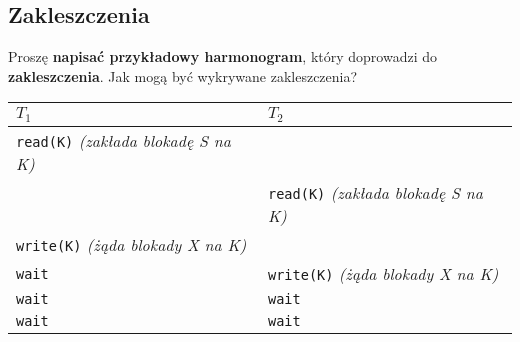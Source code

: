 \pagebreak

\subsection{Zakleszczenia} %
\label{sub:zakleszczenia}

\horrule{0.5pt}
Proszę \textbf{napisać przykładowy harmonogram}, który doprowadzi do
\textbf{zakleszczenia}.
Jak mogą być wykrywane zakleszczenia?\\
\horrule{0.5pt}

\begin{center}
    \begin{tabular}{|p{5cm}|p{5cm}|}
        \hline
        \textbf{$T_1$} & \textbf{$T_2$} \\
        \hline
        \texttt{read(K)} \textit{(zakłada blokadę S na K)} & \texttt{}\\
        \texttt{} & \texttt{read(K)} \textit{(zakłada blokadę S na K)}\\
        \texttt{write(K)} \textit{(żąda blokady X na K)} & \texttt{}\\
        \texttt{wait} & \texttt{write(K)} \textit{(żąda blokady X na K)}\\
        \texttt{wait} & \texttt{wait}\\
        \texttt{wait} & \texttt{wait}\\
        \hline
    \end{tabular}
\end{center}


